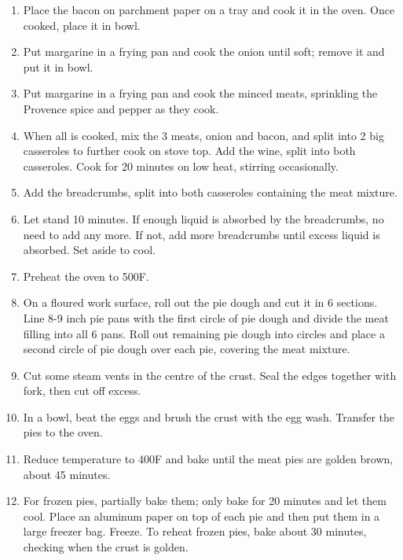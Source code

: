 
\begin{enumerate}
    \item Place the bacon on parchment paper on a tray and cook it in the oven. Once cooked, place it in bowl.
    \item Put margarine in a frying pan and cook the onion until soft; remove it and put it in bowl.
    \item Put margarine in a frying pan and cook the minced meats, sprinkling the Provence spice and pepper as they cook.
    \item When all is cooked, mix the 3 meats, onion and bacon, and split into 2 big casseroles to further cook on stove top. Add the wine, split into both casseroles. Cook for 20 minutes on low heat, stirring occasionally.
    \item Add the breadcrumbs, split into both casseroles containing the meat mixture.
    \item Let stand 10 minutes. If enough liquid is absorbed by the breadcrumbs, no need to add any more. If not, add more breadcrumbs until excess liquid is absorbed. Set aside to cool.
    \item Preheat the oven to 500\degree F.
    \item On a floured work surface, roll out the pie dough and cut it in 6 sections. Line 8-9 inch pie pans with the first circle of pie dough and divide the meat filling into all 6 pans. Roll out remaining pie dough into circles and place a second circle of pie dough over each pie, covering the meat mixture.
    \item Cut some steam vents in the centre of the crust. Seal the edges together with fork, then cut off excess.
    \item In a bowl, beat the eggs and brush the crust with the egg wash. Transfer the pies to the oven.
    \item Reduce temperature to 400\degree F and bake until the meat pies are golden brown, about 45 minutes.
    \item For frozen pies, partially bake them; only bake for 20 minutes and let them cool. Place an aluminum paper on top of each pie and then put them in a large freezer bag. Freeze. To reheat frozen pies, bake about 30 minutes, checking when the crust is golden.
\end{enumerate}